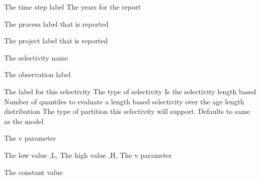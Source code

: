  {The time step label}
 {The years for the report}
\par\textbf{}\par
\par\textbf{}\par
{} {The process label that is reported}
\par\textbf{}\par
{} {The project label that is reported}
\par\textbf{}\par
\par\textbf{}\par
{} {The selectivity name}
\par\textbf{}\par
{} {The observation label}
\par\textbf{}\par
\par\textbf{}\par
{}\par\par
{} {The label for this selectivity}
 {The type of selectivity}
 {Is the selectivity length based}
 {Number of quantiles to evaluate a length based selectivity over the age length distribution}
 {The type of partition this selectivity will support. Defaults to same as the model}
 {}
 {}
\par\textbf{}\par
{} {The v parameter}
\par\textbf{}\par
{} {The low value ,L,}
 {The high value ,H,}
 {The v parameter}
\par\textbf{}\par
{} {The constant value}
